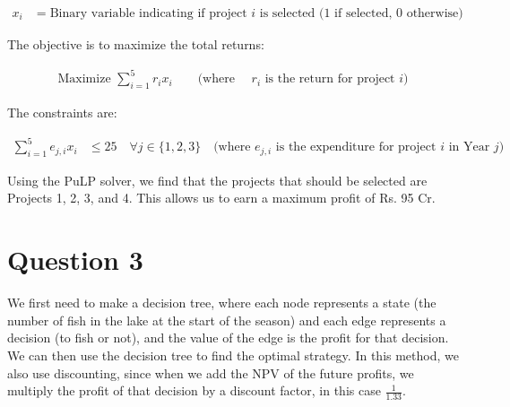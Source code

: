 \documentclass[a4paper]{article}
\begin{document}
\begin{align*}
    x_i &= \text{Binary variable indicating if project } i \text{ is selected (1 if selected, 0 otherwise)}
\end{align*}

The objective is to maximize the total returns:

\begin{align*}
    \text{Maximize } \sum_{i=1}^{5} r_i x_i \quad \quad \text{(where } \quad r_i \text{ is the return for project } i \text{)}
\end{align*}

The constraints are:

\begin{align*}
    \sum_{i=1}^{5} e_{j,i} x_i &\leq 25 \quad \forall {j \in \{1, 2, 3\}} \quad \text{(where } e_{j,i} \text{ is the expenditure for project } i \text{ in Year } j)
\end{align*}

Using the PuLP solver, we find that the projects that should be selected are Projects 1, 2, 3, and 4. This allows us to earn a maximum profit of Rs. 95 Cr.


\newpage
\section*{Question 3}

We first need to make a decision tree, where each node represents a state (the number of fish in the lake at the start of the season) and each edge represents a decision (to fish or not), and the value of the edge is the profit for that decision. We can then use the decision tree to find the optimal strategy. In this method, we also use discounting, since when we add the NPV of the future profits, we multiply the profit of that decision by a discount factor, in this case $\frac{1}{1.33}$.
\end{document}
